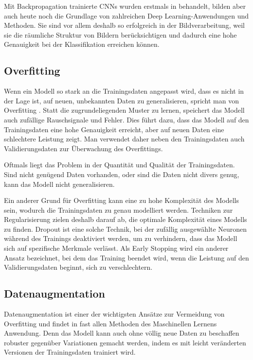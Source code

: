 Mit Backpropagation trainierte CNNs wurden erstmals in \parencite{LeCun1989cnnbackprop} behandelt, bilden aber auch heute noch die Grundlage von zahlreichen Deep Learning-Anwendungen und Methoden. Sie sind vor allem deshalb so erfolgreich in der Bildverarbeitung, weil sie die räumliche Struktur von Bildern berücksichtigen und dadurch eine hohe Genauigkeit bei der Klassifikation erreichen können.

\subsection{Overfitting} \label{sec:overfitting}

Wenn ein Modell so stark an die Trainingsdaten angepasst wird, dass es nicht in der Lage ist, auf neuen, unbekannten Daten zu generalisieren, spricht man von Overfitting \parencite{Goodfellow2016deeplearning}. Statt die zugrundeliegenden Muster zu lernen, speichert das Modell auch zufällige Rauschsignale und Fehler. Dies führt dazu, dass das Modell auf den Trainingsdaten eine hohe Genauigkeit erreicht, aber auf neuen Daten eine schlechtere Leistung zeigt. Man verwendet daher neben den Trainingsdaten auch Validierungsdaten zur Überwachung des Overfittings.

Oftmals liegt das Problem in der Quantität und Qualität der Trainingsdaten. Sind nicht genügend Daten vorhanden, oder sind die Daten nicht divers genug, kann das Modell nicht generalisieren.

Ein anderer Grund für Overfitting kann eine zu hohe Komplexität des Modells sein, wodurch die Trainingsdaten zu genau modelliert werden. Techniken zur Regularisierung zielen deshalb darauf ab, die optimale Komplexität eines Modells zu finden. Dropout \parencite{Srivastava2014dropout} ist eine solche Technik, bei der zufällig ausgewählte Neuronen während des Trainings deaktiviert werden, um zu verhindern, dass das Modell sich auf spezifische Merkmale verlässt. Als Early Stopping wird ein anderer Ansatz bezeichnet, bei dem das Training beendet wird, wenn die Leistung auf den Validierungsdaten beginnt, sich zu verschlechtern.

\subsection{Datenaugmentation} \label{sec:data-augmentation}

Datenaugmentation ist einer der wichtigsten Ansätze zur Vermeidung von Overfitting und findet in fast allen Methoden des Maschinellen Lernens Anwendung. Denn das Modell kann auch ohne völlig neue Daten zu beschaffen robuster gegenüber Variationen gemacht werden, indem es mit leicht veränderten Versionen der Trainingsdaten trainiert wird.

